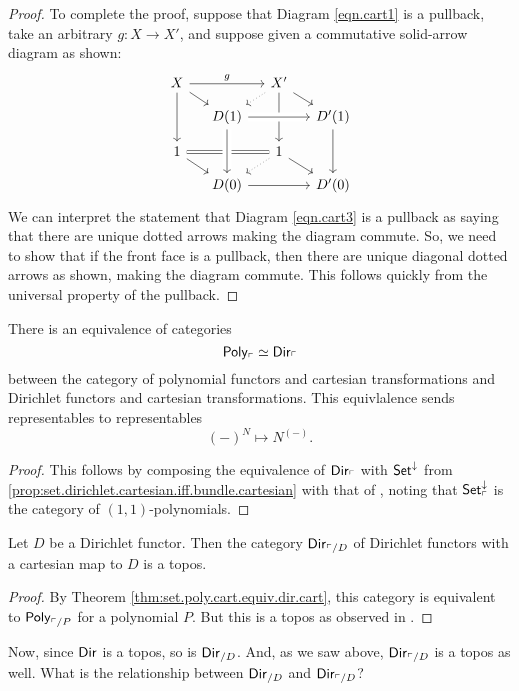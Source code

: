 \begin{proof}
To complete the proof, suppose that Diagram \eqref{eqn.cart1} is a pullback, take an arbitrary $g\colon X\to X'$, and suppose given a commutative solid-arrow diagram as shown:
\[
\begin{tikzcd}[sep=small]
  X\ar[rr, "g"]\ar[dd]\ar[rd]&&
  X'\ar[dr]\ar[dd]\ar[dl, dotted]\\&
  D(1)\ar[rr, crossing over]&&
  D'(1)\ar[dd]\\
  1\ar[dr]\ar[rr, equal]&&
  1\ar[dr]\ar[dl, dotted]\\&
  D(0)\ar[from=uu, crossing over]\ar[rr]&&
  D'(0)
\end{tikzcd}
\]
We can interpret the statement that Diagram \eqref{eqn.cart3} is a pullback as
saying that there are unique dotted arrows making the diagram commute. So, we need to show that if the front face is a pullback, then there are unique diagonal dotted arrows as shown, making the diagram commute. This follows quickly from the universal property of the pullback.
\end{proof}

\begin{thm}\label{thm:set.poly.cart.equiv.dir.cart}
  There is an equivalence of categories
  $$\mathsf{{Poly}}_{\ulcorner} \simeq \operatorname{\mathsf{{Dir}}}_{\ulcorner}$$
  between the category of polynomial functors and cartesian transformations and
  Dirichlet functors and cartesian transformations. This equivlalence sends
  representables to representables
  $$(-)^N \mapsto N^{(-)}.$$
\end{thm}
\begin{proof}
This follows by composing the equivalence of $\operatorname{\mathsf{{Dir}}}_{\ulcorner}$ with
$\operatorname{\mathsf{{Set}}}^{\mathbin{\downarrow}}$ from
\cref{prop:set.dirichlet.cartesian.iff.bundle.cartesian} with that of
\cite[Proposition 3.14]{kock2012polynomial}, noting that
$\operatorname{\mathsf{{Set}}}^{\mathbin{\downarrow}}_{\ulcorner}$ is the category of $(1,1)$-polynomials. 
\end{proof}

\begin{cor}
  Let $D$ be a Dirichlet functor. Then the category
  $\operatorname{\mathsf{{Dir}}}_{\ulcorner/D}$
  of Dirichlet functors with a cartesian map to $D$ is a topos.
\end{cor}
\begin{proof}
By Theorem \ref{thm:set.poly.cart.equiv.dir.cart}, this category is equivalent
to $\mathsf{{Poly}}_{\ulcorner/P}$ for a polynomial $P$. But this is a topos as
observed in \cite[Remark 2.6.2]{GHK:Analytic.Monads}.
\end{proof}

Now, since $\operatorname{\mathsf{{Dir}}}$ is a topos, so is $\operatorname{\mathsf{{Dir}}}_{/D}$. And, as we saw above,
$\operatorname{\mathsf{{Dir}}}_{\ulcorner/D}$ is a topos as well. What is the relationship between
$\operatorname{\mathsf{{Dir}}}_{/D}$ and $\operatorname{\mathsf{{Dir}}}_{\ulcorner/D}$?

